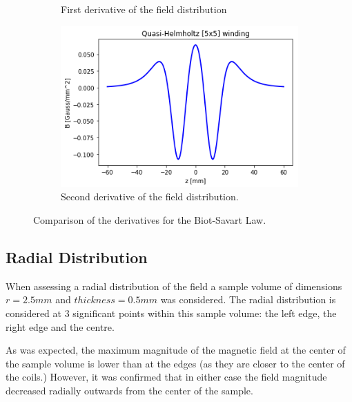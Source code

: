 \documentclass[%
 reprint,
 amsmath,
 amssymb,
 aps,
]{revtex4-1}
\begin{document}
\begin{figure}
\begin{subfigure}[b]{0.3\textwidth}
                \caption{First derivative of the field distribution}
                \label{fig:three sin x}
            \end{subfigure}
            \hfill
            \begin{subfigure}[b]{0.3\textwidth}
                \centering
                \includegraphics[width=\textwidth]{mag2.png}
                \caption{Second derivative of the field distribution.}
                \label{fig:five over x}
            \end{subfigure}
            \caption{Comparison of the derivatives for the Biot-Savart Law.}
            \label{fig:three graphs}
        \end{figure}
	\subsection{\label{sec:level2} Radial Distribution}
	
	When assessing a radial distribution of the field a sample volume of dimensions $r=2.5mm$ and $thickness=0.5mm$ was considered. The radial distribution is considered at 3 significant points within this sample volume: the left edge, the right edge and the centre.

As was expected, the maximum magnitude of the magnetic field at the center of the sample volume is lower than at the edges (as they are closer to the center of the coils.) However, it was confirmed that in either case the field magnitude decreased radially outwards from the center of the sample.
\end{document}
